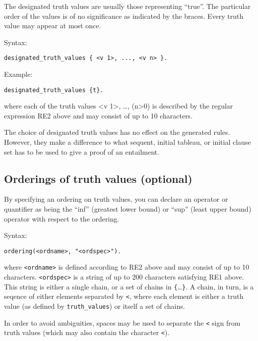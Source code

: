 \documentclass[]{article}
\begin{document}
The designated truth values are usually those representing ``true''. The
particular order of the values is of no significance as indicated by the
braces. Every truth value may appear at most once.

Syntax:

\begin{verbatim}
designated_truth_values { <v 1>, ..., <v n> }.
\end{verbatim}

Example:

\begin{verbatim}
designated_truth_values {t}.
\end{verbatim}

where each of the truth values \textless{}v 1\textgreater{}, \ldots{},
(n\textgreater{}0) is described by the regular expression RE2 above and
may consist of up to 10 characters.

The choice of designated truth values has no effect on the generated
rules. However, they make a difference to what sequent, initial tableau,
or initial clause set has to be used to give a proof of an entailment.

\hypertarget{orderings-of-truth-values-optional}{%
\subsection{Orderings of truth values
(optional)}\label{orderings-of-truth-values-optional}}

By specifying an ordering on truth values, you can declare an operator
or quantifier as being the ``inf'' (greatest lower bound) or ``sup''
(least upper bound) operator with respect to the ordering.

Syntax:

\begin{verbatim}
ordering(<ordname>, "<ordspec>").
\end{verbatim}

where \texttt{\textless{}ordname\textgreater{}} is defined according to
RE2 above and may consist of up to 10 characters.
\texttt{\textless{}ordspec\textgreater{}} is a string of up to 200
characters satisfying RE1 above. This string is either a single chain,
or a set of chains in \texttt{\{}\ldots{}\texttt{\}}. A chain, in turn,
is a seqence of either elements separated by \texttt{\textless{}}, where
each element is either a truth value (as defined by
\texttt{truth\_values}) or itself a set of chains.

In order to avoid ambiguities, spaces may be used to separate the
\texttt{\textless{}} sign from truth values (which may also contain the
character \texttt{\textless{}}).
\end{document}
